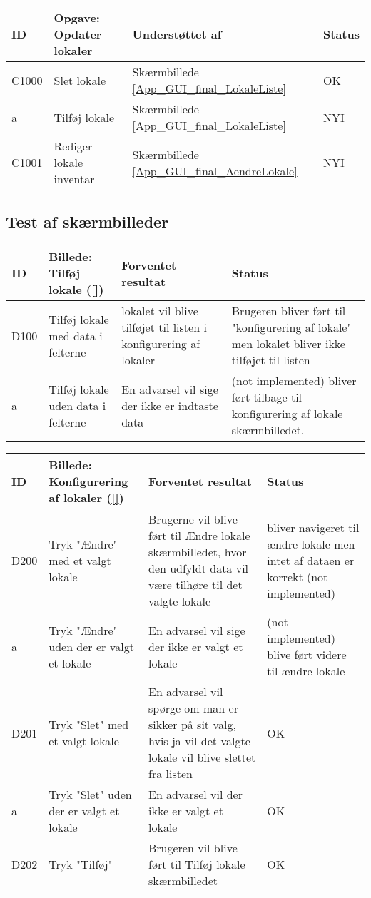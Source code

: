 \begin{longtable}{ |p{0.85cm}| p{7cm} | p{5.5cm} | p{2cm} | }
\hline
ID & Opgave: Opdater lokaler & Understøttet af & Status\\ 
\hline
C1000 & Slet lokale & Skærmbillede \ref{App_GUI_final_LokaleListe} & OK \\
\hline
a & Tilføj lokale & Skærmbillede \ref{App_GUI_final_LokaleListe} & NYI \\
\hline
C1001 & Rediger lokale inventar & Skærmbillede \ref{App_GUI_final_AendreLokale} & NYI \\
\hline
\end{longtable}
\pagebreak

\subsection{Test af skærmbilleder}
\label{App_Test_ListOfTest_ScreenTests}
\begin{longtable}{ |p{0.85cm}| p{7cm} | p{7.15cm} | p{1cm} | }
\hline
ID & Billede: Tilføj lokale (\ref{})  & Forventet resultat & Status\\ 
\hline
D100 &Tilføj lokale med data i felterne & lokalet vil blive tilføjet til listen i konfigurering af lokaler & Brugeren bliver ført til "konfigurering af lokale" men lokalet bliver ikke tilføjet til listen \\
\hline
a & Tilføj lokale uden data i felterne  & En advarsel vil sige der ikke er indtaste data &(not implemented) bliver ført tilbage til konfigurering af lokale skærmbilledet. \\
\hline
\end{longtable}

\begin{longtable}{ |p{0.85cm}| p{7cm} | p{7.15cm} | p{1cm} | }
\hline
ID & Billede: Konfigurering af lokaler (\ref{}) & Forventet resultat & Status\\ 
\hline
D200 & Tryk "Ændre" med et valgt lokale & Brugerne vil blive ført til Ændre lokale skærmbilledet, hvor den udfyldt data vil være tilhøre til det valgte lokale & bliver navigeret til ændre lokale men intet af dataen er korrekt (not implemented) \\
\hline
a & Tryk "Ændre" uden der er valgt et lokale & En advarsel vil sige der ikke er valgt et lokale & (not implemented) blive ført videre til ændre lokale \\
\hline
D201 & Tryk "Slet" med et valgt lokale &En advarsel vil spørge om man er sikker på sit valg, hvis ja vil det valgte lokale vil blive slettet fra listen & OK \\
\hline
a & Tryk "Slet" uden der er valgt et lokale & En advarsel vil der ikke er valgt et lokale & OK \\
\hline
D202 & Tryk "Tilføj" & Brugeren vil blive ført til Tilføj lokale skærmbilledet & OK\\
\hline
\end{longtable}

